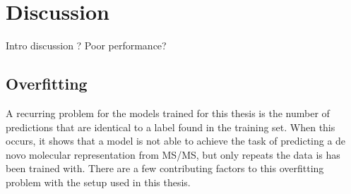 \chapter{Discussion}
\label{chap:discussion}

Intro discussion ? Poor performance?

\section{Overfitting}

A recurring problem for the models trained for this thesis is the number of predictions that are identical to a label found in the training set.
When this occurs, it shows that a model is not able to achieve the task of predicting a de novo molecular representation from \ac{MS/MS}, but only repeats the data is has been trained with.
There are a few contributing factors to this overfitting problem with the setup used in this thesis.

